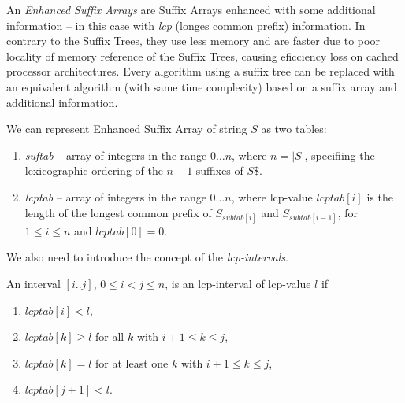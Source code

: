 An \textit{Enhanced Suffix Arrays} are Suffix Arrays enhanced with some additional information -- in this case with \textit{lcp} (longes common prefix) information.
In contrary to the Suffix Trees, they use less memory and are faster due to poor locality of memory reference of the Suffix Trees, causing eficciency loss on cached processor architectures.
Every algorithm using a suffix tree can be replaced with an equivalent
algorithm (with same time complecity) based on a suffix array and additional information\cite{enhancedsuffixarrays}.

We can represent Enhanced Suffix Array of string $S$ as two tables:
\begin{enumerate}
  \item \textit{suftab} -- array of integers in the range $0\dots n$, where $n = |S|$, specifiing the lexicographic ordering of the $n + 1$ suffixes of $S\$$.
  \item \textit{lcptab} -- array of integers in the range $0\dots n$, where lcp-value $lcptab[i]$ is the length of the longest common prefix of $S_{subtab[i]}$ and $S_{subtab[i-1]}$, for $1 \leq i \leq n$ and $lcptab[0] = 0$.
\end{enumerate}

We also need to introduce the concept of the \textit{lcp-intervals}.
\begin{definition}
An interval $[i..j]$, $0 \leq i < j \leq n$, is an lcp-interval of lcp-value $l$ if

\begin{enumerate}
\item $lcptab[i] < l$,
\item $lcptab[k] \geq l$ for all $k$ with $i + 1 \leq k \leq j$,
\item $lcptab[k] = l$ for at least one $k$ with $i + 1 \leq k \leq j$,
\item $lcptab[j + 1] < l$.
\end{enumerate}

\end{definition}

